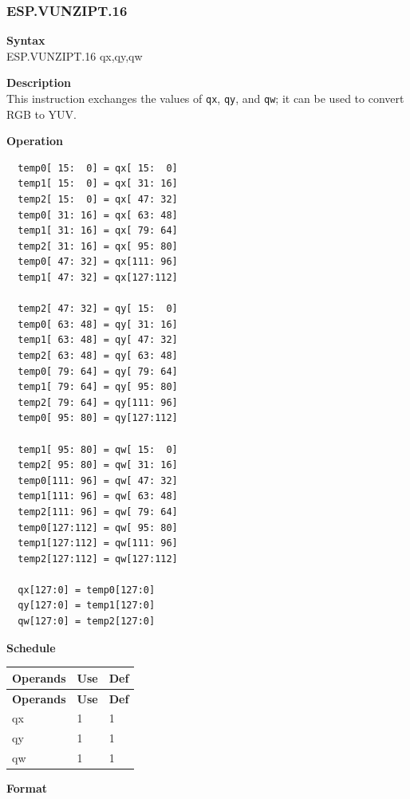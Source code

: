 \newpage
\subsubsection{ESP.VUNZIPT.16}\label{instruction:ESPVUNZIPT16}
\textbf{Syntax}\\
ESP.VUNZIPT.16 qx,qy,qw

\textbf{Description}\\
This instruction exchanges the values of \lstinline{qx}, \lstinline{qy}, and \lstinline{qw}; it can be used to convert RGB to YUV.

\textbf{Operation}\\
\begin{lstlisting}
  temp0[ 15:  0] = qx[ 15:  0]
  temp1[ 15:  0] = qx[ 31: 16]
  temp2[ 15:  0] = qx[ 47: 32]
  temp0[ 31: 16] = qx[ 63: 48]
  temp1[ 31: 16] = qx[ 79: 64]
  temp2[ 31: 16] = qx[ 95: 80]
  temp0[ 47: 32] = qx[111: 96]
  temp1[ 47: 32] = qx[127:112]

  temp2[ 47: 32] = qy[ 15:  0]
  temp0[ 63: 48] = qy[ 31: 16]
  temp1[ 63: 48] = qy[ 47: 32]
  temp2[ 63: 48] = qy[ 63: 48]
  temp0[ 79: 64] = qy[ 79: 64]
  temp1[ 79: 64] = qy[ 95: 80]
  temp2[ 79: 64] = qy[111: 96]
  temp0[ 95: 80] = qy[127:112]

  temp1[ 95: 80] = qw[ 15:  0]
  temp2[ 95: 80] = qw[ 31: 16]
  temp0[111: 96] = qw[ 47: 32]
  temp1[111: 96] = qw[ 63: 48]
  temp2[111: 96] = qw[ 79: 64]
  temp0[127:112] = qw[ 95: 80]
  temp1[127:112] = qw[111: 96]
  temp2[127:112] = qw[127:112]

  qx[127:0] = temp0[127:0]
  qy[127:0] = temp1[127:0]
  qw[127:0] = temp2[127:0]

\end{lstlisting}

\textbf{Schedule}\\
\begin{longtable}[c]{|l|l|l|}
    \hline
    \rowcolor{lightgray}
    \textbf{Operands} & \textbf{Use} & \textbf{Def} \\\hline
    \endfirsthead
    \hline
    \rowcolor{lightgray}
     \textbf{Operands} & \textbf{Use} & \textbf{Def} \\\hline
    \endhead
    \hline
    \endfoot

  qx & 1 & 1 \\\hline
  qy & 1 & 1 \\\hline
  qw & 1 & 1

\end{longtable}

\textbf{Format}\\

